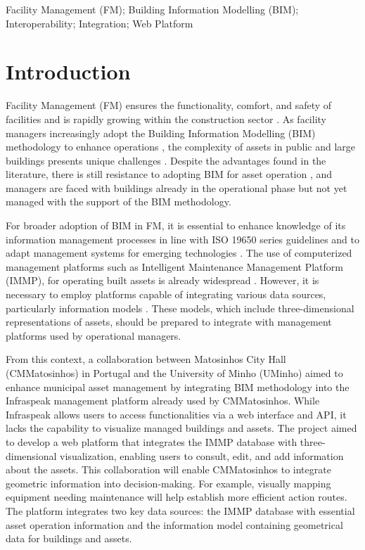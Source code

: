 \documentclass[a4paper, 10pt, twocolumn, twoside]{article}
\begin{document}
\begin{keywords}
Facility Management (FM); Building Information Modelling (BIM); Interoperability; Integration; Web Platform
\end{keywords}


\section{Introduction}
\label{sec:Introduction}

Facility Management (FM) ensures the functionality, comfort, and safety of facilities \cite{IFMA2023} and is rapidly growing within the construction sector \cite{Pinti2022}. As facility managers increasingly adopt the Building Information Modelling (BIM) methodology to enhance operations \cite{Marocco2021}, the complexity of assets in public and large buildings presents unique challenges \cite{Pinti2022}. Despite the advantages found in the literature, there is still resistance to adopting BIM for asset operation \cite{Durdyev2022}, and managers are faced with buildings already in the operational phase but not yet managed with the support of the BIM methodology.

For broader adoption of BIM in FM, it is essential to enhance knowledge of its information management processes in line with ISO 19650 series guidelines and to adapt management systems for emerging technologies \cite{Durdyev2022}. The use of computerized management platforms such as Intelligent Maintenance Management Platform (IMMP), for operating built assets is already widespread \cite{Marocco2021, Siccardi2023}. However, it is necessary to employ platforms capable of integrating various data sources, particularly information models \cite{Al-Kasasbeh2021}. These models, which include three-dimensional representations of assets, should be prepared to integrate with management platforms used by operational managers.

From this context, a collaboration between Matosinhos City Hall (CMMatosinhos) in Portugal and the University of Minho (UMinho) aimed to enhance municipal asset management by integrating BIM methodology into the Infraspeak management platform already used by CMMatosinhos. While Infraspeak allows users to access functionalities via a web interface and API, it lacks the capability to visualize managed buildings and assets. The project aimed to develop a web platform that integrates the IMMP database with three-dimensional visualization, enabling users to consult, edit, and add information about the assets.  This collaboration will enable CMMatosinhos to integrate geometric information into decision-making. For example, visually mapping equipment needing maintenance will help establish more efficient action routes. The platform integrates two key data sources: the IMMP database with essential asset operation information and the information model containing geometrical data for buildings and assets.
\end{document}
